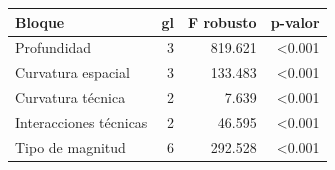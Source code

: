 \begin{tabular}{lrrr}
\toprule
Bloque & gl & F robusto & p-valor \\
\midrule
Profundidad & 3 & 819.621 & <0.001 \\
Curvatura espacial & 3 & 133.483 & <0.001 \\
Curvatura técnica & 2 & 7.639 & <0.001 \\
Interacciones técnicas & 2 & 46.595 & <0.001 \\
Tipo de magnitud & 6 & 292.528 & <0.001 \\
\bottomrule
\end{tabular}
